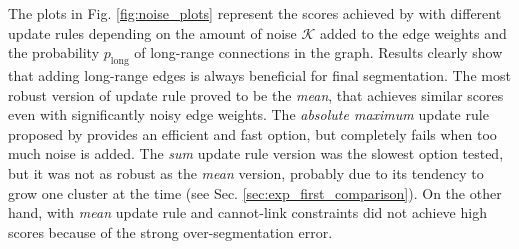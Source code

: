 The plots in Fig. \ref{fig:noise_plots} represent the scores achieved by \algname{} with different update rules depending on the amount of noise $\mathcal{K}$ added to the edge weights and the probability $p_{\mathrm{long}}$ of long-range connections in the graph. Results clearly show that adding long-range edges is always beneficial for final segmentation.  The most robust version of update rule proved to be the \emph{mean}, that achieves similar scores even with significantly noisy edge weights. The \emph{absolute maximum} update rule proposed by \cite{wolf2018mutex} provides an efficient and fast option, but completely fails when too much noise is added. 
The \emph{sum} update rule version was the slowest option tested, but it was not as robust as the \emph{mean} version, probably due to its tendency to grow one cluster at the time (see Sec. \ref{sec:exp_first_comparison}). 
On the other hand, \algname{} with \emph{mean} update rule and cannot-link constraints did not achieve high scores because of the strong over-segmentation error.


